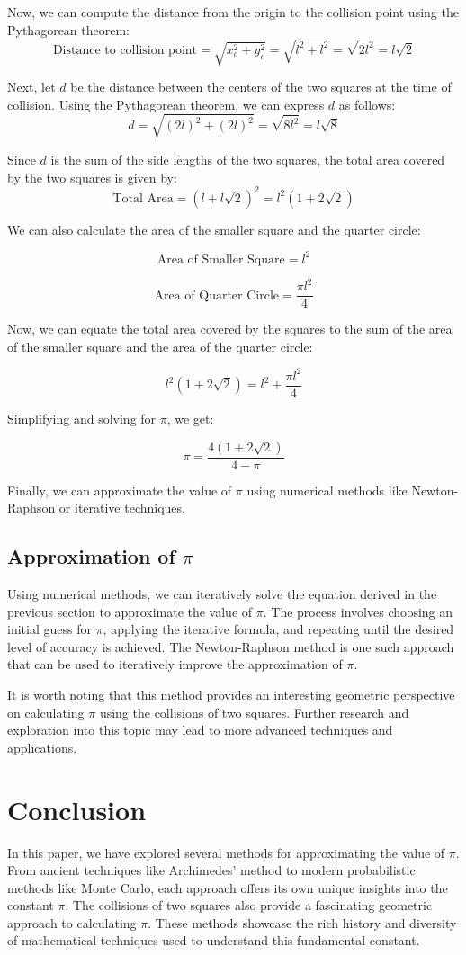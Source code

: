 \documentclass{article}
\begin{document}
Now, we can compute the distance from the origin to the collision point using the Pythagorean theorem:
\[
\text{Distance to collision point} = \sqrt{x_c^2 + y_c^2} = \sqrt{l^2 + l^2} = \sqrt{2l^2} = l\sqrt{2}
\]

Next, let $d$ be the distance between the centers of the two squares at the time of collision. Using the Pythagorean theorem, we can express $d$ as follows:
\[
d = \sqrt{(2l)^2 + (2l)^2} = \sqrt{8l^2} = l\sqrt{8}
\]

Since $d$ is the sum of the side lengths of the two squares, the total area covered by the two squares is given by:
\[
\text{Total Area} = (l + l\sqrt{2})^2 = l^2(1 + 2\sqrt{2})
\]

We can also calculate the area of the smaller square and the quarter circle:

\[
\text{Area of Smaller Square} = l^2
\]

\[
\text{Area of Quarter Circle} = \frac{\pi l^2}{4}
\]

Now, we can equate the total area covered by the squares to the sum of the area of the smaller square and the area of the quarter circle:

\[
l^2(1 + 2\sqrt{2}) = l^2 + \frac{\pi l^2}{4}
\]

Simplifying and solving for $\pi$, we get:

\[
\pi = \frac{4(1 + 2\sqrt{2})}{4 - \pi}
\]

Finally, we can approximate the value of $\pi$ using numerical methods like Newton-Raphson or iterative techniques.

\subsection{Approximation of $\pi$}

Using numerical methods, we can iteratively solve the equation derived in the previous section to approximate the value of $\pi$. The process involves choosing an initial guess for $\pi$, applying the iterative formula, and repeating until the desired level of accuracy is achieved. The Newton-Raphson method is one such approach that can be used to iteratively improve the approximation of $\pi$.

It is worth noting that this method provides an interesting geometric perspective on calculating $\pi$ using the collisions of two squares. Further research and exploration into this topic may lead to more advanced techniques and applications.

\section{Conclusion}
In this paper, we have explored several methods for approximating the value of $\pi$. From ancient techniques like Archimedes' method to modern probabilistic methods like Monte Carlo, each approach offers its own unique insights into the constant $\pi$. The collisions of two squares also provide a fascinating geometric approach to calculating $\pi$. These methods showcase the rich history and diversity of mathematical techniques used to understand this fundamental constant.
\end{document}

